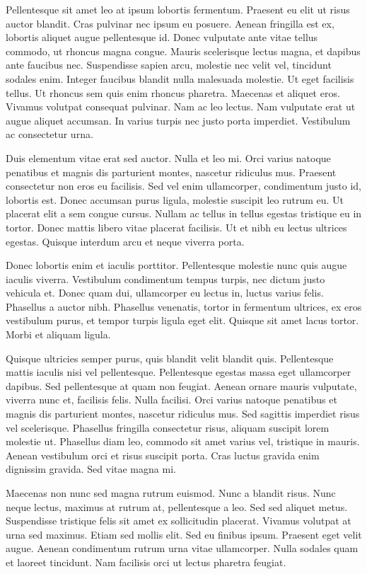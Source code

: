 Pellentesque sit amet leo at ipsum lobortis fermentum. Praesent eu elit ut risus auctor blandit. Cras pulvinar nec ipsum eu posuere. Aenean fringilla est ex, lobortis aliquet augue pellentesque id. Donec vulputate ante vitae tellus commodo, ut rhoncus magna congue. Mauris scelerisque lectus magna, et dapibus ante faucibus nec. Suspendisse sapien arcu, molestie nec velit vel, tincidunt sodales enim. Integer faucibus blandit nulla malesuada molestie. Ut eget facilisis tellus. Ut rhoncus sem quis enim rhoncus pharetra. Maecenas et aliquet eros. Vivamus volutpat consequat pulvinar. Nam ac leo lectus. Nam vulputate erat ut augue aliquet accumsan. In varius turpis nec justo porta imperdiet. Vestibulum ac consectetur urna.

Duis elementum vitae erat sed auctor. Nulla et leo mi. Orci varius natoque penatibus et magnis dis parturient montes, nascetur ridiculus mus. Praesent consectetur non eros eu facilisis. Sed vel enim ullamcorper, condimentum justo id, lobortis est. Donec accumsan purus ligula, molestie suscipit leo rutrum eu. Ut placerat elit a sem congue cursus. Nullam ac tellus in tellus egestas tristique eu in tortor. Donec mattis libero vitae placerat facilisis. Ut et nibh eu lectus ultrices egestas. Quisque interdum arcu et neque viverra porta.

Donec lobortis enim et iaculis porttitor. Pellentesque molestie nunc quis augue iaculis viverra. Vestibulum condimentum tempus turpis, nec dictum justo vehicula et. Donec quam dui, ullamcorper eu lectus in, luctus varius felis. Phasellus a auctor nibh. Phasellus venenatis, tortor in fermentum ultrices, ex eros vestibulum purus, et tempor turpis ligula eget elit. Quisque sit amet lacus tortor. Morbi et aliquam ligula.

Quisque ultricies semper purus, quis blandit velit blandit quis. Pellentesque mattis iaculis nisi vel pellentesque. Pellentesque egestas massa eget ullamcorper dapibus. Sed pellentesque at quam non feugiat. Aenean ornare mauris vulputate, viverra nunc et, facilisis felis. Nulla facilisi. Orci varius natoque penatibus et magnis dis parturient montes, nascetur ridiculus mus. Sed sagittis imperdiet risus vel scelerisque. Phasellus fringilla consectetur risus, aliquam suscipit lorem molestie ut. Phasellus diam leo, commodo sit amet varius vel, tristique in mauris. Aenean vestibulum orci et risus suscipit porta. Cras luctus gravida enim dignissim gravida. Sed vitae magna mi.

Maecenas non nunc sed magna rutrum euismod. Nunc a blandit risus. Nunc neque lectus, maximus at rutrum at, pellentesque a leo. Sed sed aliquet metus. Suspendisse tristique felis sit amet ex sollicitudin placerat. Vivamus volutpat at urna sed maximus. Etiam sed mollis elit. Sed eu finibus ipsum. Praesent eget velit augue. Aenean condimentum rutrum urna vitae ullamcorper. Nulla sodales quam et laoreet tincidunt. Nam facilisis orci ut lectus pharetra feugiat.

